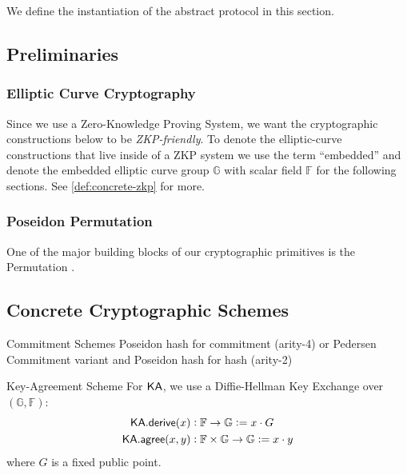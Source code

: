 
We define the instantiation of the abstract protocol in this section.

\subsection{Preliminaries}

\subsubsection{Elliptic Curve Cryptography}

Since we use a Zero-Knowledge Proving System, we want the cryptographic constructions below to be \emph{ZKP-friendly}. To denote the elliptic-curve constructions that live inside of a ZKP system we use the term ``embedded'' and denote the embedded elliptic curve group $\mathbb{G}$ with scalar field $\mathbb{F}$ for the following sections. See \autoref{def:concrete-zkp} for more.

\subsubsection{Poseidon Permutation}

One of the major building blocks of our cryptographic primitives is the \Poseidon{} Permutation \cite{KRRS21USENIX}.

\subsection{Concrete Cryptographic Schemes}

\begin{definitiontoc}{Commitment Schemes}
    Poseidon hash \cite{KRRS21USENIX} for \UTXO{} commitment (arity-4) or Pedersen Commitment variant and Poseidon hash for \VN{} hash (arity-2)
\end{definitiontoc}

\begin{definitiontoc}{Key-Agreement Scheme}
    For ${\textsf{KA}}$, we use a Diffie-Hellman Key Exchange over $(\mathbb{G}, \mathbb{F})$:
    \begin{align*}
        {\textsf{KA}}.{\textsf{derive}}(x)   &: \mathbb{F} \to \mathbb{G}                   := x \cdot G \\
        {\textsf{KA}}.{\textsf{agree}}(x, y) &: \mathbb{F} \times \mathbb{G} \to \mathbb{G} := x \cdot y
    \end{align*}
    where $G$ is a fixed public point.
\end{definitiontoc}

